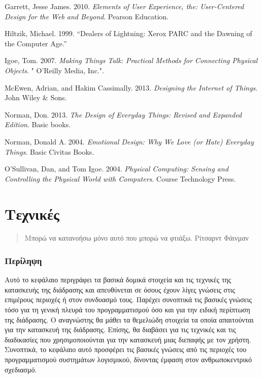 \documentclass[
]{article}
\newlength{\cslhangindent}
\newlength{\cslentryspacingunit} %
\newenvironment{CSLReferences}[2] %
 {%
  \setlength{\parindent}{0pt}
  \ifodd #1
  \let\oldpar\par
  \def\par{\hangindent=\cslhangindent\oldpar}
  \fi
  \setlength{\parskip}{#2\cslentryspacingunit}
 }%
 {}
\begin{document}
\hypertarget{refs}{}
\begin{CSLReferences}{0}{0}
\end{CSLReferences}

Garrett, Jesse James. 2010. \emph{Elements of User Experience, the:
User-Centered Design for the Web and Beyond}. Pearson Education.

Hiltzik, Michael. 1999. {``Dealers of Lightning: Xerox PARC and the
Dawning of the Computer Age.''}

Igoe, Tom. 2007. \emph{Making Things Talk: Practical Methods for
Connecting Physical Objects}. " O'Reilly Media, Inc.".

McEwen, Adrian, and Hakim Cassimally. 2013. \emph{Designing the Internet
of Things}. John Wiley \& Sons.

Norman, Don. 2013. \emph{The Design of Everyday Things: Revised and
Expanded Edition}. Basic books.

Norman, Donald A. 2004. \emph{Emotional Design: Why We Love (or Hate)
Everyday Things}. Basic Civitas Books.

O'Sullivan, Dan, and Tom Igoe. 2004. \emph{Physical Computing: Sensing
and Controlling the Physical World with Computers}. Course Technology
Press.

\hypertarget{ux3c4ux3b5ux3c7ux3bdux3b9ux3baux3adux3c2}{%
\section{Τεχνικές}\label{ux3c4ux3b5ux3c7ux3bdux3b9ux3baux3adux3c2}}

\begin{quote}
Μπορώ να κατανοήσω μόνο αυτό που μπορώ να φτιάξω. Ρίτσαρντ Φάινμαν
\end{quote}

\hypertarget{ux3c0ux3b5ux3c1ux3afux3bbux3b7ux3c8ux3b7}{%
\subsubsection{Περίληψη}\label{ux3c0ux3b5ux3c1ux3afux3bbux3b7ux3c8ux3b7}}

Αυτό το κεφάλαιο περιγράφει τα βασικά δομικά στοιχεία και τις τεχνικές
της κατασκευής της διάδρασης και απευθύνεται σε όσους έχουν λίγες
γνώσεις στις επιμέρους περιοχές ή στον συνδυασμό τους. Παρέχει συνοπτικά
τις βασικές γνώσεις τόσο για τη γενική πλευρά του προγραμματισμού όσο
και για την ειδική περίπτωση της διάδρασης. Ο αναγνώστης θα μάθει τα
θεμελιώδη στοιχεία τα οποία απαιτούνται για την κατασκευή της διάδρασης.
Επίσης, θα διαβάσει για τις τεχνικές και τις διαδικασίες που
χρησιμοποιούνται για την κατασκευή μιας διεπαφής με τον χρήστη.
Συνοπτικά, το κεφάλαιο αυτό προσφέρει τις βασικές γνώσεις από τις
περιοχές του προγραμματισμού συστημάτων λογισμικού, δίνοντας έμφαση στον
ανθρωποκεντρικό σχεδιασμό.
\end{document}
